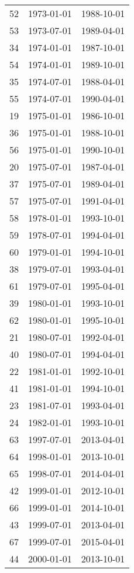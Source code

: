 % 
\begin{tabular}{ccc}
  \hline
  \hline
52 & 1973-01-01 & 1988-10-01 \\ 
  53 & 1973-07-01 & 1989-04-01 \\ 
  34 & 1974-01-01 & 1987-10-01 \\ 
  54 & 1974-01-01 & 1989-10-01 \\ 
  35 & 1974-07-01 & 1988-04-01 \\ 
  55 & 1974-07-01 & 1990-04-01 \\ 
  19 & 1975-01-01 & 1986-10-01 \\ 
  36 & 1975-01-01 & 1988-10-01 \\ 
  56 & 1975-01-01 & 1990-10-01 \\ 
  20 & 1975-07-01 & 1987-04-01 \\ 
  37 & 1975-07-01 & 1989-04-01 \\ 
  57 & 1975-07-01 & 1991-04-01 \\ 
  58 & 1978-01-01 & 1993-10-01 \\ 
  59 & 1978-07-01 & 1994-04-01 \\ 
  60 & 1979-01-01 & 1994-10-01 \\ 
  38 & 1979-07-01 & 1993-04-01 \\ 
  61 & 1979-07-01 & 1995-04-01 \\ 
  39 & 1980-01-01 & 1993-10-01 \\ 
  62 & 1980-01-01 & 1995-10-01 \\ 
  21 & 1980-07-01 & 1992-04-01 \\ 
  40 & 1980-07-01 & 1994-04-01 \\ 
  22 & 1981-01-01 & 1992-10-01 \\ 
  41 & 1981-01-01 & 1994-10-01 \\ 
  23 & 1981-07-01 & 1993-04-01 \\ 
  24 & 1982-01-01 & 1993-10-01 \\ 
  63 & 1997-07-01 & 2013-04-01 \\ 
  64 & 1998-01-01 & 2013-10-01 \\ 
  65 & 1998-07-01 & 2014-04-01 \\ 
  42 & 1999-01-01 & 2012-10-01 \\ 
  66 & 1999-01-01 & 2014-10-01 \\ 
  43 & 1999-07-01 & 2013-04-01 \\ 
  67 & 1999-07-01 & 2015-04-01 \\ 
  44 & 2000-01-01 & 2013-10-01 \\ 

\end{tabular}
